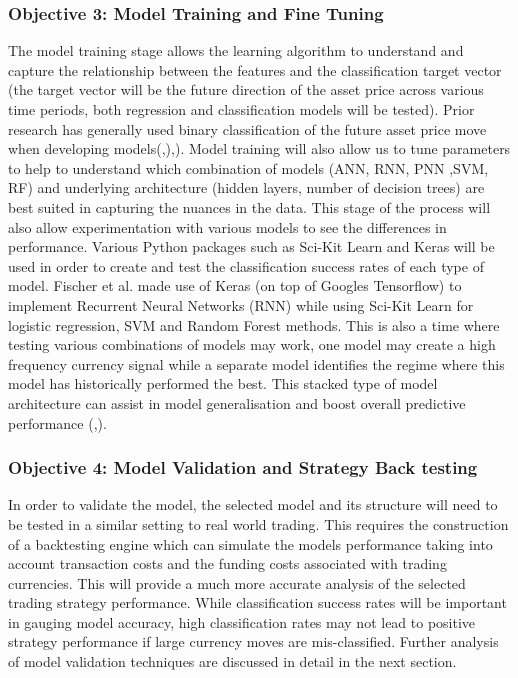 \documentclass[11pt, a4paper]{article}
\begin{document}
\subsubsection{Objective 3: Model Training and Fine Tuning}
The model training stage allows the learning algorithm to understand and capture the relationship between the features and the classification target vector (the target vector will be the future direction of the asset price across various time periods, both regression and classification models will be tested). Prior research has generally used binary classification of the future asset price move when developing models(\cite{Abreu2018},\cite{Gunduz2017}),\cite{Chatzis2018}). \newline Model training will also allow us to tune parameters to help to understand which combination of models (ANN, RNN, PNN ,SVM, RF) and underlying architecture (hidden layers, number of decision trees) are best suited in capturing the nuances in the data. This stage of the process will also allow experimentation with various  models to see the differences in performance. Various Python packages such as Sci-Kit Learn and Keras will be used in order to create and test the classification success rates of each type of model. Fischer et al. made use of Keras (on top of Googles Tensorflow) to implement Recurrent Neural Networks (RNN) \cite{Fischer2018} while using Sci-Kit Learn for logistic regression, SVM and Random Forest methods. \newline This is also a time where testing various combinations of models may work, one model may create a high frequency currency signal while a separate model identifies the regime where this model has historically performed the best. This stacked type of model architecture can assist in model generalisation and boost overall predictive performance (\cite{Chatzis2018},\cite{Stock2010}).


 
\subsubsection{Objective 4: Model Validation and Strategy Back testing}
In order to validate the model, the selected model and its structure will need to be tested in a similar setting to real world trading. This requires the construction of a backtesting engine which can simulate the models performance taking into account transaction costs and the funding costs associated with trading currencies.
This will provide a much more accurate analysis of the selected trading strategy performance. While classification success rates will be important in gauging model accuracy, high classification rates may not lead to positive strategy performance if large currency moves are mis-classified. Further analysis of model validation techniques are discussed in detail in the next section.
\end{document}
